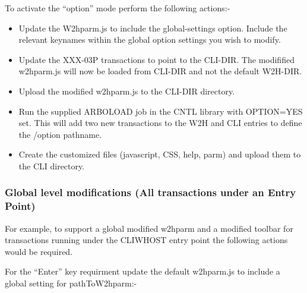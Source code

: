 \documentclass[letterpaper,10pt,english]{sphinxmanual}
\begin{document}
To activate the “option” mode perform the following actions:-
\begin{itemize}
\item {} 
Update the W2hparm.js to include the global-settings option. Include the relevant keynames within the global option settings you wish to modify.

\item {} 
Update the XXX-03P transactions to point to the CLI-DIR. The modifified w2hparm.js will now be loaded from CLI-DIR and not the default W2H-DIR.

\item {} 
Upload the modified w2hparm.js to the CLI-DIR directory.

\item {} 
Run the supplied ARBOLOAD job in the CNTL library with OPTION=YES set. This will add two new transactions to the W2H and CLI entries to define the /option pathname.

\item {} 
Create the customized files (javascript, CSS, help, parm) and upload them to the CLI directory.

\end{itemize}


\subsubsection{Global level modifications (All transactions under an Entry Point)}
\label{\detokenize{User_Guide:global-level-modifications-all-transactions-under-an-entry-point}}
For example, to support a global modified w2hparm and a modified toolbar for transactions running under the CLIWHOST entry point the following actions would be required.

For the “Enter” key requirment update the default w2hparm.js to include a global setting for pathToW2hparm:-

\begin{sphinxVerbatim}[commandchars=\\\{\}]
\end{sphinxVerbatim}
\end{document}
